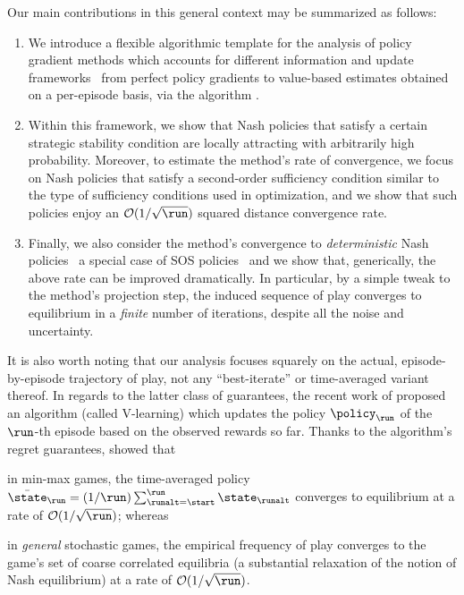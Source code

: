 Our main contributions in this general context may be summarized as follows:
\begin{enumerate}
\item
We introduce a flexible algorithmic template for the analysis of policy gradient methods which accounts for different information and update frameworks \textendash\ from perfect policy gradients to value-based estimates obtained on a per-episode basis, \eg via the \reinforce algorithm \cite{williams1992simple,sutton1999policy,baxter2001infinite}.
\item
Within this framework, we show that Nash policies that satisfy a certain strategic stability condition are locally attracting with arbitrarily high probability.
Moreover, to estimate the method's rate of convergence, we focus on Nash policies that satisfy a second-order sufficiency condition similar to the type of sufficiency conditions used in optimization, and we show that such policies enjoy an $\bigoh(1/\sqrt{\run})$ squared distance convergence rate.
\item
Finally, we also consider the method's convergence to \emph{deterministic} Nash policies \textendash\ a special case of \ac{SOS} policies \textendash\ and we show that, generically, the above rate can be improved dramatically.
In particular, by a simple tweak to the method's projection step, the induced sequence of play converges to equilibrium in a \emph{finite} number of iterations, despite all the noise and uncertainty.
\end{enumerate}

It is also worth noting that our analysis focuses squarely on the actual, episode-by-episode trajectory of play, not any ``best-iterate'' or time-averaged variant thereof.
\beginrev
In regards to the latter class of guarantees, the recent work of \citet{JLWY21} proposed an algorithm (called V-learning) which updates the policy $\policy_{\run}$ of the $\run$-th episode based on the observed rewards so far.
Thanks to the algorithm's regret guarantees, \citet{JLWY21} showed that
\begin{enumerate*}
\item
in min-max games, the time-averaged policy $\bar\state_{\run} = (1/\run) \sum_{\runalt=\start}^{\run} \iter$ converges to equilibrium at a rate of $\bigoh(1/\sqrt{\run})$;
whereas
\item
in \emph{general} stochastic games, the empirical frequency of play converges to the game's set of coarse correlated equilibria (a substantial relaxation of the notion of Nash equilibrium) at a rate of $\bigoh(1/\sqrt{\run})$.
\end{enumerate*}

